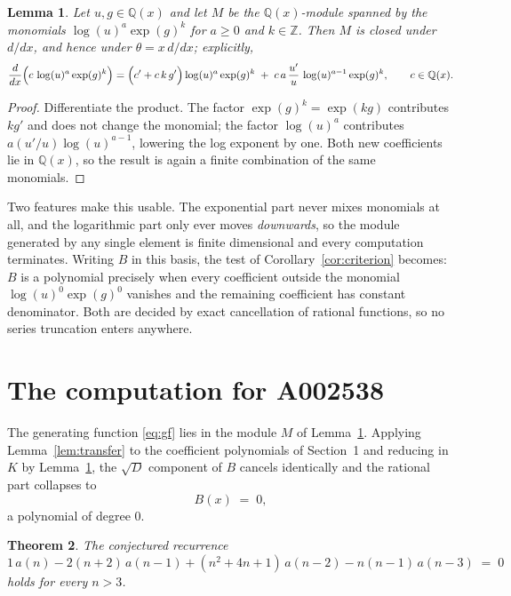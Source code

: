 \documentclass[11pt,a4paper]{article}
\theoremstyle{plain}
\newtheorem{theorem}{Theorem}
\newtheorem{lemma}[theorem]{Lemma}
\theoremstyle{definition}
\begin{document}
\begin{lemma}\label{lem:field}
Let $u,g\in\mathbb{Q}(x)$ and let $M$ be the $\mathbb{Q}(x)$-module spanned by the
monomials $\log(u)^{a}\exp(g)^{k}$ for $a\ge0$ and $k\in\mathbb{Z}$. Then $M$ is closed
under $d/dx$, and hence under $\theta=x\,d/dx$; explicitly,
\[
\frac{d}{dx}\Bigl(c\,\log(u)^{a}\exp(g)^{k}\Bigr)
=\Bigl(c'+c\,k\,g'\Bigr)\log(u)^{a}\exp(g)^{k}
\;+\;c\,a\,\frac{u'}{u}\,\log(u)^{a-1}\exp(g)^{k},
\qquad c\in\mathbb{Q}(x).
\]
\end{lemma}

\begin{proof}
Differentiate the product. The factor $\exp(g)^{k}=\exp(kg)$ contributes $kg'$ and does
not change the monomial; the factor $\log(u)^{a}$ contributes $a(u'/u)\log(u)^{a-1}$,
lowering the log exponent by one. Both new coefficients lie in $\mathbb{Q}(x)$, so the
result is again a finite combination of the same monomials.
\end{proof}

Two features make this usable. The exponential part never mixes monomials at all, and the
logarithmic part only ever moves \emph{downwards}, so the module generated by any single
element is finite dimensional and every computation terminates. Writing $B$ in this basis,
the test of Corollary~\ref{cor:criterion} becomes: $B$ is a polynomial precisely when every
coefficient outside the monomial $\log(u)^{0}\exp(g)^{0}$ vanishes and the remaining
coefficient has constant denominator. Both are decided by exact cancellation of rational
functions, so no series truncation enters anywhere.

\section{The computation for A002538}

The generating function \eqref{eq:gf} lies in the module $M$ of
Lemma~\ref{lem:field}.
Applying Lemma~\ref{lem:transfer} to the coefficient polynomials of Section~1 and reducing
in $K$ by Lemma~\ref{lem:field}, the $\sqrt{D}$ component of $B$ cancels identically and
the rational part collapses to
\[
B(x)\;=\;0 ,
\]
a polynomial of degree $0$.

\begin{theorem}
The conjectured recurrence
\[
1\,a(n) -  2 \left(n + 2\right)\,a(n-1) + (n^{2} + 4 n + 1)\,a(n-2) -  n \left(n - 1\right)\,a(n-3) \;=\;0
\]
holds for every $n>3$.
\end{theorem}
\end{document}
